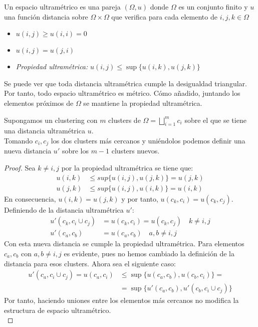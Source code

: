 \begin{defi}
Un espacio ultramétrico es una pareja $(\Omega,u)$ donde $\Omega$ es un conjunto finito y $u$ una función distancia sobre $\Omega\times \Omega $ que verifica para cada elemento de $i,j,k\in \Omega$
\begin{itemize}
\item $u(i,j)\geq u(i,i)=0$
\item $u(i,j)=u(j,i)$
\item \textit{Propiedad ultramétrica: } $u(i,j)\leq \sup \lbrace u(i,k),u(j,k)\rbrace $
\end{itemize}
\end{defi}
\noindent Se puede ver que toda distancia ultramétrica cumple la desigualdad triangular. Por tanto, todo espacio ultramétrico es métrico. Cómo añadido, juntando los elementos próximos de $\Omega$ se mantiene la propiedad ultramétrica. 

\begin{teorema}
Supongamos un clustering con $m$ clusters de $\Omega =\bigsqcup_{i=1}^m c_i$ sobre el que se tiene una distancia ultramétrica $u$.\\
Tomando $c_i,c_j$ los dos clusters más cercanos y uniéndolos podemos definir una nueva distancia $u'$ sobre los $m-1$ clusters nuevos. 
\begin{proof}
Sea $k\neq i,j$ por la propiedad ultramétrica se tiene que: 
\begin{equation}
\begin{split}
u(i,k)&\leq sup\lbrace u(i,j),u(j,k) \rbrace = u(j,k) \\
u(j,k)&\leq sup\lbrace u(i,j),u(i,k) \rbrace = u(i,k)
\end{split}
\end{equation}
En consecuencia, $u(i,k)=u(j,k)$ y por tanto, $u(c_k,c_i)=u(c_k,c_j)$.\\
Definiendo de la distancia ultramétrica $u'$:
\begin{equation}
\begin{split}
u'(c_k,c_i\cup c_j) &= u(c_k,c_i) = u(c_k,c_j) \quad k\neq i,j\\
u'(c_a,c_b) &= u(c_a,c_b) \quad a,b\neq i,j
\end{split}
\end{equation}
Con esta nueva distancia se cumple la propiedad ultramétrica. Para elementos $c_a,c_b$ con $a,b \neq i,j $ es evidente, pues no hemos cambiado la definición de la distancia para esos clusters. Ahora sea el siguiente caso:
\begin{equation}
\begin{split}
u'(c_a,c_i\cup c_j)=u(c_a,c_i)&\leq \sup\lbrace u(c_a,c_b), u(c_b,c_i)\rbrace =\\
&= \sup\lbrace u'(c_a,c_b), u'(c_b,c_i\cup c_j)\rbrace
\end{split}
\end{equation}
Por tanto, haciendo uniones entre los elementos más cercanos no modifica la estructura de espacio ultramétrico. \\
\qedhere
\end{proof}
\end{teorema}

